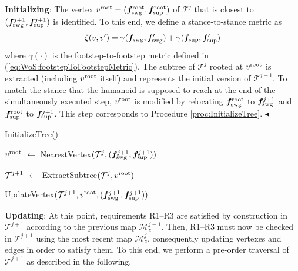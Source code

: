 {\bf Initializing}: The vertex $v^{\rm root} = ({\bm{f}}_{\rm swg}^{\rm root}, {\bm{f}}_{\rm sup}^{\rm root})$ of $\mathcal{T}^{j}$ that is closest to $({\bm{f}}_{\rm swg}^{j+1}, {\bm{f}}_{\rm sup}^{j+1})$ is identified. To this end, we define a stance-to-stance metric as
\begin{equation}
    \label{eq:WoS:metricIdentifyRoot}
    \zeta(v, v') = \gamma({\bm{f}}_{\rm swg}, {\bm{f}}'_{\rm swg}) + \gamma({\bm{f}}_{\rm sup}, {\bm{f}}'_{\rm sup}) 
\end{equation}
where $\gamma(\cdot)$ is the footstep-to-footstep metric defined in (\ref{eq:WoS:footstepToFootstepMetric}).
The subtree of $\mathcal{T}^{j}$ rooted at $v^{\rm root}$ is extracted (including $v^{\rm root}$ itself) and represents the initial version of $\mathcal{T}^{j+1}$.
To match the stance that the humanoid is supposed to reach at the end of the simultaneously executed step, $v^{\rm root}$ is modified by relocating ${\bm{f}}_{\rm swg}^{\rm root}$ to ${\bm{f}}_{\rm swg}^{j+1}$ and ${\bm{f}}_{\rm sup}^{\rm root}$ to ${\bm{f}}_{\rm sup}^{j+1}$.
This step corresponds to Procedure \ref{proc:InitializeTree}.
\hfill $\blacktriangleleft$
\begin{procedure}%
	\small
	\removelatexerror
	\caption{InitializeTree()}
	\label{proc:InitializeTree}

	\vspace{2pt}
    \BlankLine
	
	$v^{\rm root}$ $\leftarrow$ NearestVertex$({\cal T}^j, ({\bm{f}}_{\rm swg}^{j+1}, {\bm{f}}_{\rm sup}^{j+1}))$\;
	
	${\cal T}^{j+1}$ $\leftarrow$ ExtractSubtree$({\cal T}^j, v^{\rm root})$\;
	
	UpdateVertex$({\cal T}^{j+1}, v^{\rm root}, ({\bm{f}}_{\rm swg}^{j+1}, {\bm{f}}_{\rm sup}^{j+1}))$\;
	
    \;
	
\end{procedure}

{\bf Updating}: At this point, requirements R1--R3 are satisfied by construction in $\mathcal{T}^{j+1}$ according to the previous map $\mathcal{M}_z^{j-1}$.
Then, R1--R3 must now be checked in $\mathcal{T}^{j+1}$ using the most recent map $\mathcal{M}_z^{j}$, consequently updating vertexes and edges in order to satisfy them.
To this end, we perform a pre-order traversal of $\mathcal{T}^{j+1}$ as described in the following.

